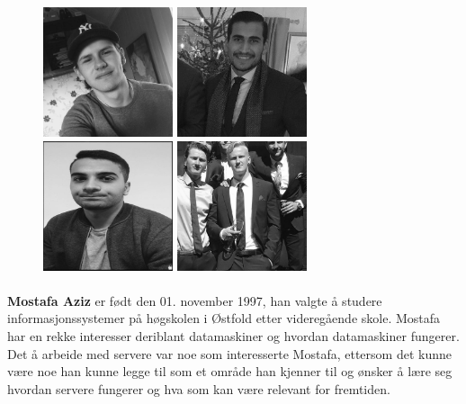 \begin{figure}[h]
\centering
\includegraphics[width=1.5in]{Bilder/victor2.jpg}
\includegraphics[width=1.5in]{Bilder/erhan2.jpg}
\includegraphics[width=1.5in]{Bilder/mosti2.jpg}
\includegraphics[width=1.5in]{Bilder/thomas2.jpg}
\end{figure}


\paragraph{} \textbf{Mostafa Aziz} er født den 01. november 1997, han valgte å studere informasjonssystemer på høgskolen i Østfold etter videregående skole. Mostafa har en rekke interesser deriblant datamaskiner og hvordan datamaskiner fungerer. Det å arbeide med servere var noe som interesserte Mostafa, ettersom det kunne være noe han kunne legge til som et område han kjenner til og ønsker å lære seg hvordan servere fungerer og hva som kan være relevant for fremtiden.




